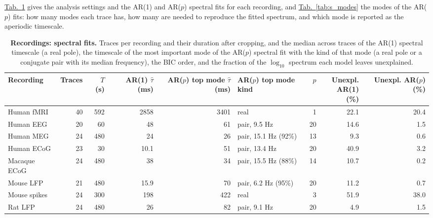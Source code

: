 \documentclass[pdflatex,lineno,sn-nature]{sn-jnl}
\newcommand{\tabpanel}[2][]{\hyperref[#2]{Tab.~#1\ref*{#2}}}
\theoremstyle{thmstyleone}
\theoremstyle{thmstyletwo}
\theoremstyle{thmstylethree}
\begin{document}
\tabpanel{tab:s_recordings} gives the analysis settings and the AR(1) and AR($p$) spectral fits for each recording, and \tabpanel{tab:s_modes} the modes of the AR($p$) fits: how many modes each trace has, how many are needed to reproduce the fitted spectrum, and which mode is reported as the aperiodic timescale.

\begin{table}[h]
\caption{\textbf{Recordings: spectral fits.} Traces per recording and their duration after cropping, and the median across traces of the AR(1) spectral timescale (a real pole), the timescale of the most important mode of the AR($p$) spectral fit with the kind of that mode (a real pole or a conjugate pair with its median frequency), the BIC order, and the fraction of the $\log_{10}$ spectrum each model leaves unexplained.}\label{tab:s_recordings}
\setlength{\tabcolsep}{3pt}
\begin{tabular}{lrrrrlrrr}
\toprule
Recording & Traces & $T$ (s) & \shortstack[c]{AR(1) \\ $\hat\tau$ (ms)} & \shortstack[c]{AR($p$) top \\ mode $\hat\tau$ (ms)} & \shortstack[c]{AR($p$) top \\ mode kind} & $p$ & \shortstack[c]{Unexpl. \\ AR(1) (\%)} & \shortstack[c]{Unexpl. \\ AR($p$) (\%)} \\
\midrule
Human fMRI & 40 & 592 & 2858 & 3401 & real & 1 & 22.1 & 20.4 \\
Human EEG & 20 & 60 & 48 & 61 & pair, 9.5 Hz & 20 & 14.6 & 1.5 \\
Human MEG & 24 & 480 & 24 & 26 & pair, 15.1 Hz (92\%) & 13 & 9.3 & 0.6 \\
Human ECoG & 23 & 30 & 10.1 & 51 & pair, 13.4 Hz & 20 & 40.9 & 3.2 \\
Macaque ECoG & 24 & 480 & 38 & 34 & pair, 15.5 Hz (88\%) & 14 & 10.7 & 0.2 \\
Mouse LFP & 21 & 480 & 15.9 & 70 & pair, 6.2 Hz (95\%) & 20 & 11.2 & 0.7 \\
Mouse spikes & 24 & 300 & 198 & 422 & real & 3 & 51.9 & 38.0 \\
Rat LFP & 24 & 480 & 26 & 82 & pair, 9.1 Hz & 20 & 4.9 & 1.5 \\
\bottomrule
\end{tabular}
\end{table}
\end{document}
